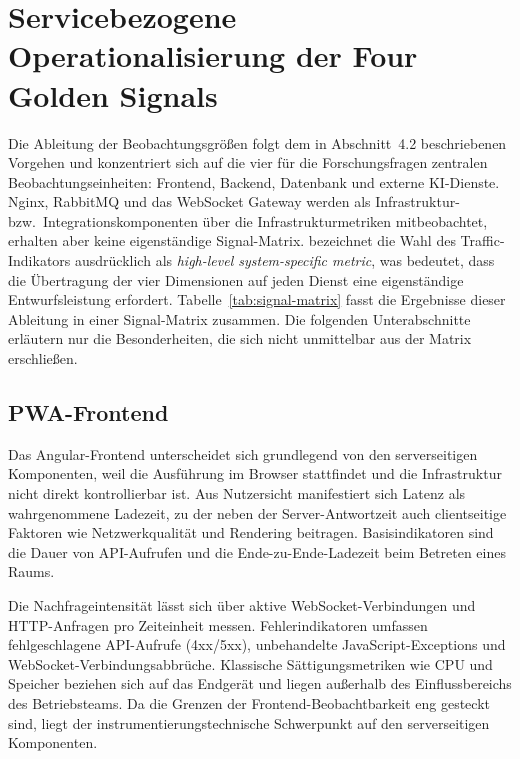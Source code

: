  
\section{Servicebezogene Operationalisierung der Four Golden Signals}
\label{sec:golden-signals-operationalisierung}
 
Die Ableitung der Beobachtungsgrößen folgt dem in Abschnitt~4.2 beschriebenen Vorgehen und konzentriert sich auf die vier für die Forschungsfragen zentralen Beobachtungseinheiten: Frontend, Backend, Datenbank und externe KI-Dienste. Nginx, RabbitMQ und das WebSocket Gateway werden als Infrastruktur- bzw.\ Integrationskomponenten über die Infrastrukturmetriken mitbeobachtet, erhalten aber keine eigenständige Signal-Matrix. \textcite[S.~60]{ewaschukMonitoringDistributedSystems} bezeichnet die Wahl des Traffic-Indikators ausdrücklich als \emph{high-level system-specific metric}, was bedeutet, dass die Übertragung der vier Dimensionen auf jeden Dienst eine eigenständige Entwurfsleistung erfordert. Tabelle~\ref{tab:signal-matrix} fasst die Ergebnisse dieser Ableitung in einer Signal-Matrix zusammen. Die folgenden Unterabschnitte erläutern nur die Besonderheiten, die sich nicht unmittelbar aus der Matrix erschließen.
 
 
\subsection{PWA-Frontend}
\label{sec:gs-frontend}
 
Das Angular-Frontend unterscheidet sich grundlegend von den serverseitigen Komponenten, weil die Ausführung im Browser stattfindet und die Infrastruktur nicht direkt kontrollierbar ist. Aus Nutzersicht manifestiert sich Latenz als wahrgenommene Ladezeit, zu der neben der Server-Antwortzeit auch clientseitige Faktoren wie Netzwerkqualität und Rendering beitragen. Basisindikatoren sind die Dauer von API-Aufrufen und die Ende-zu-Ende-Ladezeit beim Betreten eines Raums.
 
Die Nachfrageintensität lässt sich über aktive WebSocket-Verbindungen und HTTP-Anfragen pro Zeiteinheit messen. Fehlerindikatoren umfassen fehlgeschlagene API-Aufrufe (4xx/5xx), unbehandelte JavaScript-Exceptions und WebSocket-Verbindungsabbrüche. Klassische Sättigungsmetriken wie CPU und Speicher beziehen sich auf das Endgerät und liegen außerhalb des Einflussbereichs des Betriebsteams. Da die Grenzen der Frontend-Beobachtbarkeit eng gesteckt sind, liegt der instrumentierungstechnische Schwerpunkt auf den serverseitigen Komponenten.
 
